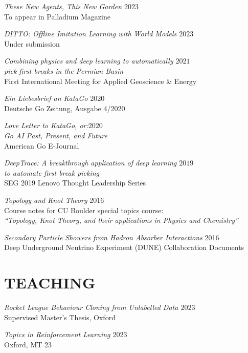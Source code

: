 \documentclass[margin]{res}
\begin{document}
\begin{resume}
                 {\sl These New Agents, This New Garden \hfill            $2023$}\\
		         To appear in Palladium Magazine

                 {\sl DITTO: Offline Imitation Learning with World Models \hfill            $2023$}\\
		         Under submission

                 {\sl Combining physics and deep learning to automatically \hfill            $2021$ \\ pick first breaks in the Permian Basin} \\
		First International Meeting for Applied Geoscience \& Energy

                {\sl Ein Liebesbrief an KataGo} \hfill 2020 \\
                Deutsche Go Zeitung, Ausgabe 4/2020

                {\sl Love Letter to KataGo, or:\hfill $2020$\\ Go AI Past, Present, and Future} \\
                American Go E-Journal

                {\sl DeepTrace: A breakthrough application of deep learning \hfill $2019$\\ to automate first break picking}  \\
                SEG 2019 Lenovo Thought Leadership Series

                {\sl Topology and Knot Theory} \hfill 2016 \\
                Course notes for CU Boulder special topics course: \\
                \textit{``Topology, Knot Theory, and their applications in Physics and Chemistry''}

                {\sl Secondary Particle Showers from Hadron Absorber Interactions} \hfill 2016 \\
                Deep Underground Neutrino Experiment (DUNE) Collaboration Documents


                \section{TEACHING}
                {\sl Rocket League Behaviour Cloning from Unlabelled Data \hfill $2023$}\\
                Supervised Master's Thesis, Oxford

                {\sl Topics in Reinforcement Learning \hfill $2023$}\\
                Oxford, MT 23


\end{resume}
\end{document}
